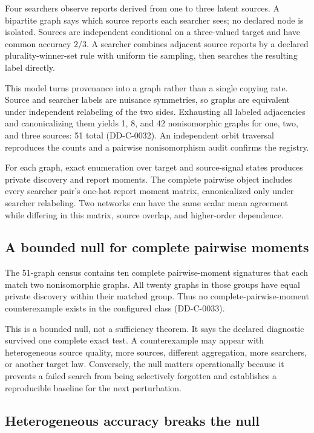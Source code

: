 \documentclass[11pt]{article}
\theoremstyle{remark}
\begin{document}
Four searchers observe reports derived from one to three latent sources. A
bipartite graph says which source reports each searcher sees; no declared node is
isolated. Sources are independent conditional on a three-valued target and have
common accuracy $2/3$. A searcher combines adjacent source reports by a declared
plurality-winner-set rule with uniform tie sampling, then searches the resulting
label directly.

This model turns provenance into a graph rather than a single copying rate. Source
and searcher labels are nuisance symmetries, so graphs are equivalent under
independent relabeling of the two sides. Exhausting all labeled adjacencies and
canonicalizing them yields 1, 8, and 42 nonisomorphic graphs for one, two, and
three sources: 51 total (DD-C-0032). An independent orbit traversal reproduces
the counts and a pairwise nonisomorphism audit confirms the registry.

For each graph, exact enumeration over target and source-signal states produces
private discovery and report moments. The complete pairwise object includes every
searcher pair's one-hot report moment matrix, canonicalized only under searcher
relabeling. Two networks can have the same scalar mean agreement while differing
in this matrix, source overlap, and higher-order dependence.

\subsection{A bounded null for complete pairwise moments}

The 51-graph census contains ten complete pairwise-moment signatures that each
match two nonisomorphic graphs. All twenty graphs in those groups have equal
private discovery within their matched group. Thus no complete-pairwise-moment
counterexample exists in the configured class (DD-C-0033).

This is a bounded null, not a sufficiency theorem. It says the declared diagnostic
survived one complete exact test. A counterexample may appear with heterogeneous
source quality, more sources, different aggregation, more searchers, or another
target law. Conversely, the null matters operationally because it prevents a
failed search from being selectively forgotten and establishes a reproducible
baseline for the next perturbation.

\subsection{Heterogeneous accuracy breaks the null}
\end{document}
